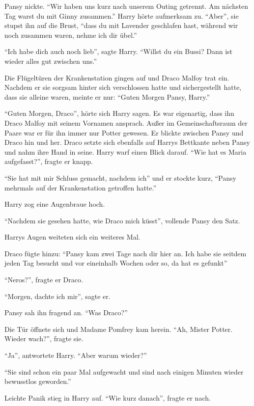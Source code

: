 Pansy nickte. \enquote{Wir haben uns kurz nach unserem Outing getrennt. Am nächsten Tag warst du mit Ginny zusammen.} Harry hörte aufmerksam zu. \enquote{Aber}, sie stupst ihn auf die Brust, \enquote{dass du mit Lavender geschlafen hast, während wir noch zusammen waren, nehme ich dir übel.}

\enquote{Ich habe dich auch noch lieb}, sagte Harry. \enquote{Willst du ein Bussi? Dann ist wieder alles gut zwischen uns.}

Die Flügeltüren der Krankenstation gingen auf und Draco Malfoy trat ein. Nachdem er sie sorgsam hinter sich verschlossen hatte und sichergestellt hatte, dass sie alleine waren, meinte er nur: \enquote{Guten Morgen Pansy, Harry.}

\enquote{Guten Morgen, Draco}, hörte sich Harry sagen. Es war eigenartig, dass ihn Draco Malfoy mit seinem Vornamen ansprach. Außer im Gemeinschaftsraum der Paare war er für ihn immer nur Potter gewesen. Er blickte zwischen Pansy und Draco hin und her. Draco setzte sich ebenfalls auf Harrys Bettkante neben Pansy und nahm ihre Hand in seine. Harry warf einen Blick darauf. \enquote{Wie hat es Maria aufgefasst?}, fragte er knapp.

\enquote{Sie hat mit mir Schluss gemacht, nachdem ich} und er stockte kurz, \enquote{Pansy mehrmals auf der Krankenstation getroffen hatte.}

Harry zog eine Augenbraue hoch.

\enquote{Nachdem sie gesehen hatte, wie Draco mich küsst}, vollende Pansy den Satz.

Harrys Augen weiteten sich ein weiteres Mal.

Draco fügte hinzu: \enquote{Pansy kam zwei Tage nach dir hier an. Ich habe sie seitdem jeden Tag besucht und vor eineinhalb Wochen oder so, da hat es gefunkt}

\enquote{Neros?}, fragte er Draco.

\enquote{Morgen, dachte ich mir}, sagte er.

Pansy sah ihn fragend an. \enquote{Was Draco?}

Die Tür öffnete sich und Madame Pomfrey kam herein. \enquote{Ah, Mister Potter. Wieder wach?}, fragte sie.

\enquote{Ja}, antwortete Harry. \enquote{Aber warum wieder?}

\enquote{Sie sind schon ein paar Mal aufgewacht und sind nach einigen Minuten wieder bewusstlos geworden.}

Leichte Panik stieg in Harry auf. \enquote{Wie kurz danach}, fragte er nach.

